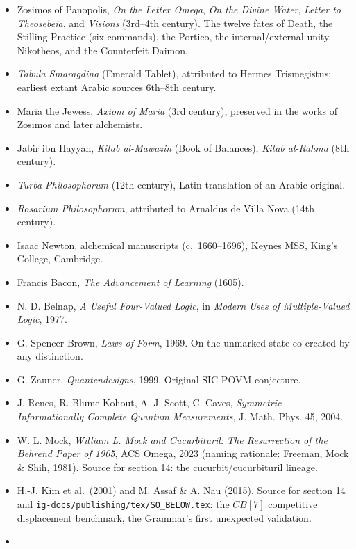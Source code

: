 \documentclass[12pt,a4paper]{article}
\begin{document}
\begin{itemize}
\tightlist
\item
  Zosimos of Panopolis, \emph{On the Letter Omega}, \emph{On the Divine
  Water}, \emph{Letter to Theosebeia}, and \emph{Visions} (3rd--4th
  century). The twelve fates of Death, the Stilling Practice (six
  commands), the Portico, the internal/external unity, Nikotheos, and
  the Counterfeit Daimon.
\item
  \emph{Tabula Smaragdina} (Emerald Tablet), attributed to Hermes
  Trismegistus; earliest extant Arabic sources 6th--8th century.
\item
  Maria the Jewess, \emph{Axiom of Maria} (3rd century), preserved in
  the works of Zosimos and later alchemists.
\item
  Jabir ibn Hayyan, \emph{Kitab al-Mawazin} (Book of Balances),
  \emph{Kitab al-Rahma} (8th century).
\item
  \emph{Turba Philosophorum} (12th century), Latin translation of an
  Arabic original.
\item
  \emph{Rosarium Philosophorum}, attributed to Arnaldus de Villa Nova
  (14th century).
\item
  Isaac Newton, alchemical manuscripts (c.~1660--1696), Keynes MSS,
  King's College, Cambridge.
\item
  Francis Bacon, \emph{The Advancement of Learning} (1605).
\item
  N. D. Belnap, \emph{A Useful Four-Valued Logic}, in \emph{Modern Uses
  of Multiple-Valued Logic}, 1977.
\item
  G. Spencer-Brown, \emph{Laws of Form}, 1969. On the unmarked state
  co-created by any distinction.
\item
  G. Zauner, \emph{Quantendesigns}, 1999. Original SIC-POVM conjecture.
\item
  J. Renes, R. Blume-Kohout, A. J. Scott, C. Caves, \emph{Symmetric
  Informationally Complete Quantum Measurements}, J. Math. Phys. 45,
  2004.
\item
  W. L. Mock, \emph{William L. Mock and Cucurbituril: The Resurrection
  of the Behrend Paper of 1905}, ACS Omega, 2023 (naming rationale:
  Freeman, Mock \& Shih, 1981). Source for section 14: the
  cucurbit/cucurbituril lineage.
\item
  H.-J. Kim et al.~(2001) and M. Assaf \& A. Nau (2015). Source for
  section 14 and \texttt{ig-docs/publishing/tex/SO\_BELOW.tex}: the
  \({CB[7]}\) competitive displacement benchmark, the Grammar's first
  unexpected validation.
\item

\end{itemize}
\end{document}
